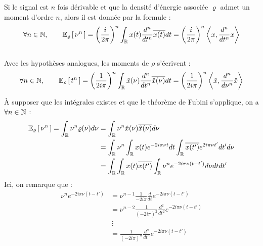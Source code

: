 \begin{proposition} \label{prop:integ_trick}
	Si le signal est $n$ fois dérivable et que la densité d’énergie associée $\varrho$ admet un moment d'ordre $n$, alors il est donnée par la formule :
	\begin{equation}\label{eq:moment_f}
		\forall n\in\N,\qquad \esp[\varrho]{\nu^n} = \left(\frac{i}{2 \pi}\right)^n  \int_\R x(t) \frac{d^n}{dt^n} \congu{x(t)} dt = \left(\frac{i}{2 \pi}\right)^n  \left\langle x, \frac{d^n}{dt^n}x\right\rangle
	\end{equation}
	\\
	Avec les hypothèses analogues, les moments de $\rho$ s'écrivent :
	\begin{equation}\label{eq:moment_t}
		\forall n\in\N,\qquad \esp[\rho]{t^n} = \left(\frac{1}{2i \pi}\right)^n  \int_\R \hat{x}(\nu) \frac{d^n}{dt^n} \congu{\hat{x}(\nu)} dt = \left(\frac{1}{2i \pi}\right)^n  \left\langle \hat{x}, \frac{d^n}{d\nu^n}\hat{x}\right\rangle
	\end{equation}
	
	\begin{demo}
		\`A supposer que les intégrales existes et que le théorème de Fubini s'applique, on a $\forall n\in\N$ :
		\begin{align*}
			\esp[\varrho]{\nu^n} = \int_\R \nu^n\varrho(\nu) d\nu &= \int_\R \nu^n \hat{x}(\nu)\congu{\hat{x}(\nu)} d\nu \\
			&= \int_\R \nu^n \int_\R x(t)e^{-2i \pi \nu t} dt \int_\R \congu{x(t')}e^{2i \pi \nu t'} dt' d\nu \\
			&= \int_\R \int_\R x(t) \congu{x(t')} \int_\R \nu^n e^{-2i \pi \nu (t-t')} d\nu dt dt' 
		\end{align*}
		Ici, on remarque que :
		\begin{align*}
			\nu^n e^{-2i \pi \nu (t-t')} &= \nu^{n-1}\frac{1}{-2i \pi}\frac{d}{dt}e^{-2i \pi \nu(t-t')} \\
			&= \nu^{n-2}\frac{1}{(-2i \pi)^2}\frac{d^2}{dt^2}e^{-2i \pi \nu(t-t')} \\
			&\ \vdots \\
			&= \frac{1}{(-2i \pi)^n}\frac{d^n}{dt^n}e^{-2i \pi \nu(t-t')}
		\end{align*}
		

\end{demo}
\end{proposition}
